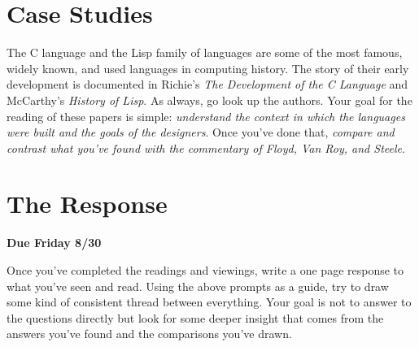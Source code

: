 \documentclass[10pt]{article}
\begin{document}
\section{Case Studies}

The C language and the Lisp family of languages are some of the most famous, widely known, and used languages in computing history.  The story of their early development is documented in Richie's \textit{The Development of the C Language} and McCarthy's \textit{History of Lisp}.  As always, go look up the authors.  Your goal for the reading of these papers is simple: \textit{understand the context in which the languages were built and the goals of the designers}. Once you've done that, \textit{compare and contrast what you've found with the commentary of Floyd, Van Roy, and Steele}.  

\section{The Response}

\begin{center}
\textbf{Due Friday 8/30}
\end{center}

Once you've completed the readings and viewings, write a one page response to what you've seen and read.  Using the above prompts as a guide, try to draw some kind of consistent thread between everything.  Your goal is not to answer to the questions directly but look for some deeper insight that comes from the answers you've found and the comparisons you've drawn.
\end{document}
